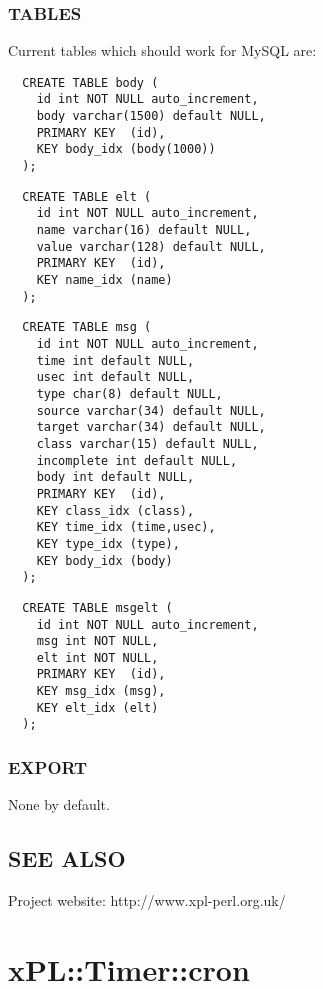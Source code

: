 \documentclass[12pt,a4paper]{article}
\begin{document}
\subsubsection*{TABLES\label{xPL::SQL_TABLES}}


Current tables which should work for MySQL are:

\begin{verbatim}
  CREATE TABLE body (
    id int NOT NULL auto_increment,
    body varchar(1500) default NULL,
    PRIMARY KEY  (id),
    KEY body_idx (body(1000))
  );
\end{verbatim}
\begin{verbatim}
  CREATE TABLE elt (
    id int NOT NULL auto_increment,
    name varchar(16) default NULL,
    value varchar(128) default NULL,
    PRIMARY KEY  (id),
    KEY name_idx (name)
  );
\end{verbatim}
\begin{verbatim}
  CREATE TABLE msg (
    id int NOT NULL auto_increment,
    time int default NULL,
    usec int default NULL,
    type char(8) default NULL,
    source varchar(34) default NULL,
    target varchar(34) default NULL,
    class varchar(15) default NULL,
    incomplete int default NULL,
    body int default NULL,
    PRIMARY KEY  (id),
    KEY class_idx (class),
    KEY time_idx (time,usec),
    KEY type_idx (type),
    KEY body_idx (body)
  );
\end{verbatim}
\begin{verbatim}
  CREATE TABLE msgelt (
    id int NOT NULL auto_increment,
    msg int NOT NULL,
    elt int NOT NULL,
    PRIMARY KEY  (id),
    KEY msg_idx (msg),
    KEY elt_idx (elt)
  );
\end{verbatim}
\subsubsection*{EXPORT\label{xPL::SQL_EXPORT}}


None by default.

\subsection*{SEE ALSO\label{xPL::SQL_SEE_ALSO}}


Project website: http://www.xpl-perl.org.uk/

\newpage
\section{xPL::Timer::cron\label{xPL::Timer::cron}}
\end{document}
